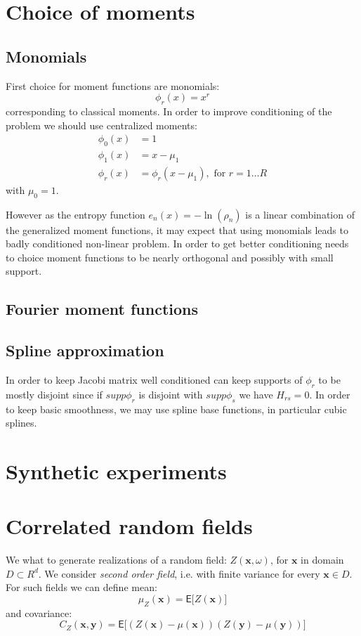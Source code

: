 \documentclass{article}
\def\vc#1{\mathbf{\boldsymbol{#1}}}     %
\def \E{{\mathsf E}}
\begin{document}
\section{Choice of moments}
\subsection{Monomials}
First choice for moment functions are monomials:
\[
    \phi_r(x) = x^r
\]
corresponding to classical moments.
In order to improve conditioning of the problem we should use centralized moments:
\begin{align}
    \phi_0(x) &= 1\\
    \phi_1(x) &= x - \mu_1\\
    \phi_r(x) &= \phi_r(x - \mu_1), \text{ for }r=1\dots R
\end{align}
with $\mu_0 = 1$.

However as the entropy function $e_n(x) = -\ln(\rho_n)$ is a linear combination of the generalized moment functions, it may expect that using monomials leads to badly conditioned non-linear problem. In order to 
get better conditioning needs to choice moment functions to be nearly orthogonal and possibly with small support.

\subsection{Fourier moment functions}


\subsection{Spline approximation}
In order to keep Jacobi matrix well conditioned can keep supports of $\phi_r$ to be mostly disjoint since if $supp \phi_r$ is disjoint with $supp \phi_s$ we have $H_{rs} = 0$.
In order to keep basic smoothness, we may use spline base functions, in particular cubic splines.



\section{Synthetic experiments}
\section{Correlated random fields}
We what to generate realizations of a random field: $Z(\vc x, \omega)$, for $\vc x$ in domain $D \subset R^d$. We consider {\it second order field}, i.e. with finite variance for every $\vc x\in D$. For such fields we can define mean:
\[
    \mu_Z(\vc x) = \E\big[ Z(\vc x) \big]
\]
and covariance:
\[
    C_Z(\vc x, \vc y) = \E\big[ (Z(\vc x) - \mu(\vc x))(Z(\vc y) - \mu(\vc y)) \big]
\]
\end{document}
